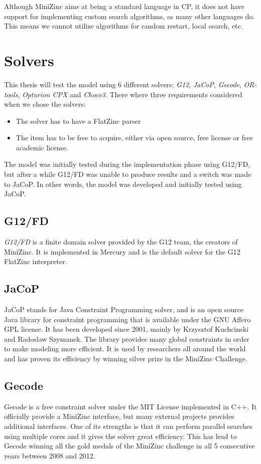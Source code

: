 Although MiniZinc aims at being a standard language in CP, it does not have support for implementing custom search algorithms, as many other languages do. This means we cannot utilize algorithms for random restart, local search, etc.
\cite{mz_paper}

\section{Solvers}
This thesis will test the model using 6 different solvers; \emph{G12}, \emph{JaCoP}, \emph{Gecode}, \emph{OR-tools}, \emph{Opturion CPX} and \emph{Choco3}. There where three requirements considered when we chose the solvers:
\begin{itemize}
\item The solver has to have a FlatZinc parser
\item The item has to be free to acquire, either via open source, free license or free academic license.
\end{itemize}

The model was initially tested during the implementation phase using G12/FD, but after a while G12/FD was unable to produce results and a switch was made to JaCoP. In other words, the model was developed and initially tested using JaCoP.

\subsection{G12/FD}
\emph{G12/FD} is a finite domain solver provided by the G12 team, the creators of MiniZinc. It is implemented in Mercury and is the default solver for the G12 FlatZinc interpreter. \cite{nicta_2964} \cite{mz_result_2014}
\subsection{JaCoP}
JaCoP stands for Java Constraint Programming solver, and is an open source Java library for constraint programming that is available under the GNU Affero GPL license. It has been developed since 2001, mainly by Krzysztof Kuchcinski and Radoslaw Szymanek. The library provides many global constraints in order to make modeling more efficient. It is used by researchers all around the world and has proven its efficiency by winning silver prize in the MiniZinc Challenge.
\cite{jacop_overview}
\cite{jacop_about}
\subsection{Gecode}
Gecode is a free constraint solver under the MIT License implemented in C++. It officially provide a MiniZinc interface, but many external projects provides additional interfaces. One of its strengths is that it can perform parallel searches using multiple cores and it gives the solver great efficiency. This has lead to Gecode winning all the gold medals of the MiniZinc challenge in all 5 consecutive years between 2008 and 2012.
\cite{gecode}
